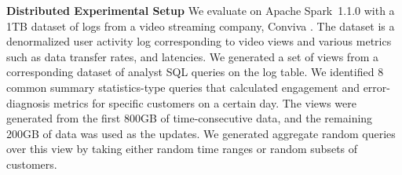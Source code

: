 \noindent\textbf{Distributed Experimental Setup}
We evaluate \svc on Apache Spark~1.1.0 with a 1TB dataset of logs from a video streaming company, Conviva \cite{conviva}.
The dataset is a denormalized user activity log corresponding to video views and various metrics such as data transfer rates, and latencies.
We generated a set of views from a corresponding dataset of analyst SQL queries on the log table.
We identified 8 common summary statistics-type queries that calculated engagement and error-diagnosis metrics for specific customers on a certain day.
The views were generated from the first 800GB of time-consecutive data, and the remaining 200GB of data was used as the updates.
We generated aggregate random queries over this view by taking either random time ranges or random subsets of customers.



